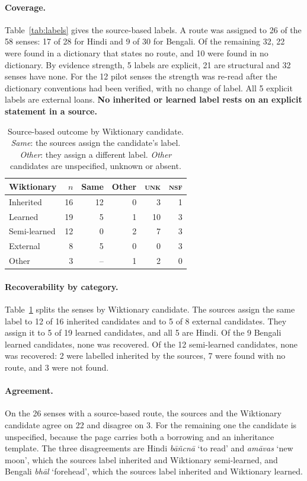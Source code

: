 \documentclass[11pt]{article}
\newcommand{\lbl}[1]{\textsc{#1}}
\newcommand{\gl}[1]{`#1'}
\begin{document}
\paragraph{Coverage.} Table~\ref{tab:labels} gives the source-based labels. A route was assigned to 26 of the 58 senses: 17 of 28 for Hindi and 9 of 30 for Bengali. Of the remaining 32, 22 were found in a dictionary that states no route, and 10 were found in no dictionary. By evidence strength, 5 labels are explicit, 21 are structural and 32 senses have none. For the 12 pilot senses the strength was re-read after the dictionary conventions had been verified, with no change of label. All 5 explicit labels are external loans. \textbf{No inherited or learned label rests on an explicit statement in a source.}

\begin{table}[h]
\centering\small
\begin{tabular}{lrrrrr}
\toprule
\textbf{Wiktionary} & \textbf{$n$} & \textbf{Same} & \textbf{Other} & \textbf{\lbl{unk}} & \textbf{\lbl{nsf}} \\
\midrule
Inherited & 16 & 12 & 0 & 3 & 1 \\
Learned & 19 & 5 & 1 & 10 & 3 \\
Semi-learned & 12 & 0 & 2 & 7 & 3 \\
External & 8 & 5 & 0 & 0 & 3 \\
Other & 3 & -- & 1 & 2 & 0 \\
\bottomrule
\end{tabular}
\caption{Source-based outcome by Wiktionary candidate. \textit{Same}: the sources assign the candidate's label. \textit{Other}: they assign a different label. \textit{Other} candidates are unspecified, unknown or absent.}
\label{tab:recover}
\end{table}

\paragraph{Recoverability by category.} Table~\ref{tab:recover} splits the senses by Wiktionary candidate. The sources assign the same label to 12 of 16 inherited candidates and to 5 of 8 external candidates. They assign it to 5 of 19 learned candidates, and all 5 are Hindi. Of the 9 Bengali learned candidates, none was recovered. Of the 12 semi-learned candidates, none was recovered: 2 were labelled inherited by the sources, 7 were found with no route, and 3 were not found.

\paragraph{Agreement.} On the 26 senses with a source-based route, the sources and the Wiktionary candidate agree on 22 and disagree on 3. For the remaining one the candidate is unspecified, because the page carries both a borrowing and an inheritance template. The three disagreements are Hindi \textit{b\=a\~ncn\=a} \gl{to read} and \textit{am\=avas} \gl{new moon}, which the sources label inherited and Wiktionary semi-learned, and Bengali \textit{bh\=al} \gl{forehead}, which the sources label inherited and Wiktionary learned.
\end{document}
